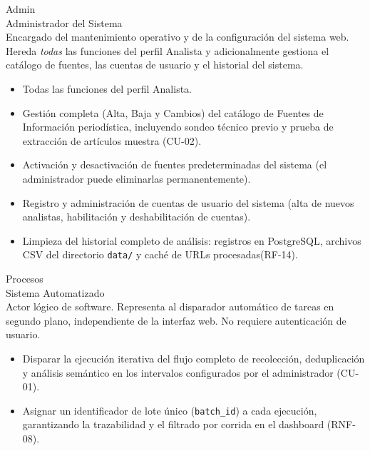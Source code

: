 \begin{Usuario}{Admin}{\\Administrador del Sistema\\}
    \Uitem[Descripción:] Encargado del mantenimiento operativo y de la configuración
    del sistema web. Hereda \textit{todas} las funciones del perfil Analista y
    adicionalmente gestiona el catálogo de fuentes, las cuentas de usuario y el
    historial del sistema.
    \Uitem[Funciones:] 
        \begin{itemize}
            \item Todas las funciones del perfil Analista.
            \item Gestión completa (Alta, Baja y Cambios) del catálogo de Fuentes de
            Información periodística, incluyendo sondeo técnico previo  y prueba de extracción
            de artículos muestra (CU-02).
            \item Activación y desactivación de fuentes predeterminadas del sistema
            (el administrador puede eliminarlas permanentemente).
            \item Registro y administración de cuentas de usuario del sistema
            (alta de nuevos analistas, habilitación y deshabilitación de cuentas).
            \item Limpieza del historial completo de análisis: registros en PostgreSQL,
            archivos CSV del directorio \texttt{data/} y caché de URLs procesadas(RF-14).
        \end{itemize}
\end{Usuario}

\begin{Usuario}{Procesos}{\\Sistema Automatizado\\} 
    \Uitem[Descripción:] Actor lógico de software. Representa al disparador automático
    de tareas en segundo plano, independiente de la interfaz web. No requiere
    autenticación de usuario.
    \Uitem[Funciones:]
        \begin{itemize}
            \item Disparar la ejecución iterativa del flujo completo de recolección,
            deduplicación y análisis semántico en los intervalos configurados por el
            administrador (CU-01).
            \item Asignar un identificador de lote único (\texttt{batch\_id}) a cada
            ejecución, garantizando la trazabilidad y el filtrado por corrida en el
            dashboard (RNF-08).
        \end{itemize}
\end{Usuario}
